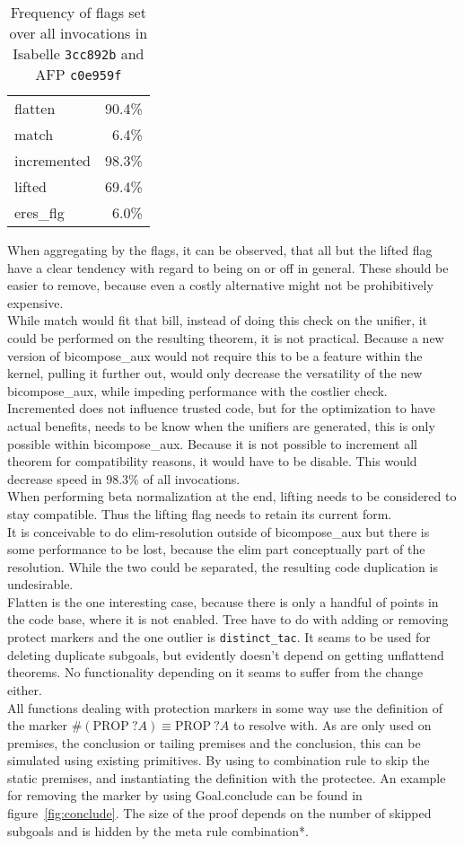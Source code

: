 \begin{table}[ht]
\caption{Frequency of flags set over all invocations in Isabelle \texttt{3cc892b} and AFP \texttt{c0e959f}}
\begin{tabular}{l r}
flatten & 90.4\%\\
match & 6.4\%\\
incremented & 98.3\%\\
lifted & 69.4\%\\
eres\_flg & 6.0\%
\end{tabular}
\label{tab:flag_freq}
\centering
\end{table}

When aggregating by the flags, it can be observed, that all but the lifted flag have a clear tendency with regard to being on or off in general. These should be easier to remove, because even a costly alternative might not be prohibitively expensive.\\
While match would fit that bill, instead of doing this check on the unifier, it could be performed on the resulting theorem, it is not practical. Because a new version of bicompose\_aux would not require this to be a feature within the kernel, pulling it further out, would only decrease the versatility of the new bicompose\_aux, while impeding performance with the costlier check.\\
Incremented does not influence trusted code, but for the optimization to have actual benefits, needs to be know when the unifiers are generated, this is only possible within bicompose\_aux. Because it is not possible to increment all theorem for compatibility reasons, it would have to be disable. This would decrease speed in 98.3\% of all invocations.\\
When performing beta normalization at the end, lifting needs to be considered to stay compatible. Thus the lifting flag needs to retain its current form.\\
It is conceivable to do elim-resolution outside of bicompose\_aux but there is some performance to be lost, because the elim part conceptually part of the resolution. While the two could be separated, the resulting code duplication is undesirable.\\
Flatten is the one interesting case, because there is only a handful of points in the code base, where it is not enabled. Tree have to do with adding or removing protect markers and the one outlier is \texttt{distinct\_tac}. It seams to be used for deleting duplicate subgoals, but evidently doesn't depend on getting unflattend theorems. No functionality depending on it seams to suffer from the change either.\\
All functions dealing with protection markers in some way use the definition of the marker $\#(\text{PROP}~?A) \equiv \text{PROP}~?A$ to resolve with. As are only used on premises, the conclusion or tailing premises and the conclusion, this can be simulated using existing primitives. By using to combination rule to skip the static premises, and instantiating the definition with the protectee. An example for removing the marker by using Goal.conclude can be found in figure~\ref{fig:conclude}. The size of the proof depends on the number of skipped subgoals and is hidden by the meta rule combination*.

